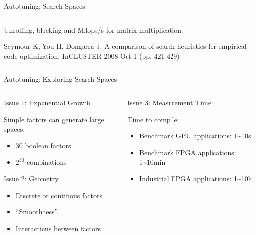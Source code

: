 \documentclass[10pt, compress, aspectratio=169, xcolor={table,usenames,dvipsnames}]{beamer}
\begin{document}
\begin{frame}[label={sec:org1e071f5}]{Autotuning: Search Spaces}
\begin{columns}
\begin{column}{0.6\columnwidth}
\begin{center}
\alert{Unrolling}, \alert{blocking} and \alert{Mflops/s} for \alert{matrix multiplication}

\vspace{.1cm}

\scriptsize{Seymour K, You H, Dongarra J. A comparison of search heuristics for empirical code optimization. InCLUSTER 2008 Oct 1 (pp. 421-429)}
\end{center}
\end{column}
\end{columns}
\end{frame}

\begin{frame}[label={sec:orgb30d112}]{Autotuning: Exploring Search Spaces}
\begin{columns}
\begin{column}{0.5\columnwidth}
\begin{block}{Issue 1: \alert{Exponential Growth}}
\vspace{.2cm}

\alert{Simple factors} can generate \alert{large spaces}:

\begin{itemize}
\item 30 \alert{boolean} factors
\item \(2^{30}\) combinations
\end{itemize}

\begin{block}{Issue 2: \alert{Geometry}}
\begin{itemize}
\item \alert{Discrete} or \alert{continous} factors
\item \alert{``Smoothness''}
\item \alert{Interactions} between factors
\end{itemize}
\end{block}
\end{block}
\end{column}

\begin{column}{0.5\columnwidth}
\begin{block}{Issue 3: \alert{Measurement Time}}
\vspace{.2cm}

Time to \alert{compile}:

\begin{itemize}
\item \alert{Benchmark} GPU applications: \alert{1\textasciitilde{}10s}
\item \alert{Benchmark} FPGA applications: \alert{1\textasciitilde{}10min}
\item \alert{Industrial} FPGA applications: \alert{1\textasciitilde{}10h}
\end{itemize}
\end{block}
\end{column}
\end{columns}
\end{frame}
\end{document}

